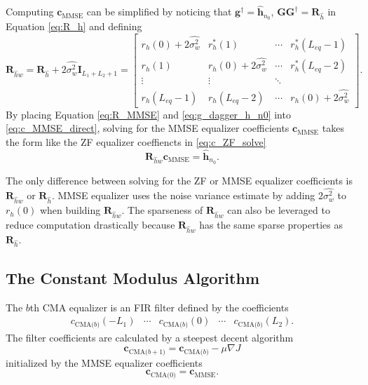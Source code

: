 Computing $\mathbf{c}_\text{MMSE}$ can be simplified by noticing that $\mathbf{g}^\dagger = \hat{\mathbf{h}}_{n_0}$, $\mathbf{G}\mathbf{G}^\dagger = \mathbf{R}_{\hat{h}}$ in Equation \eqref{eq:R_h} and defining
\begin{equation}
\mathbf{R}_{\hat{h}w} = 
\mathbf{R}_{\hat{h}} + 2\hat{\sigma^2_w} \mathbf{I}_{L_1+L_2+1} = 
		\begin{bmatrix}
		r_{h}(0) + 2\hat{\sigma^2_w}	& r^\ast_{h}(1)							& \cdots 	& r^\ast_{h}(L_{eq}-1)  	\\
		r_{h}(1) 						& r_{h}(0) + 2\hat{\sigma^2_w}& \cdots 	& r^\ast_{h}(L_{eq}-2)  				\\
		\vdots	 						& \vdots								& \ddots 	&  							\\
		r_{h}(L_{eq}-1)					& r_{h}(L_{eq}-2)						& \cdots	& r_{h}(0) + 2\hat{\sigma^2_w}  			
	\end{bmatrix}.
	\label{eq:R_MMSE}
\end{equation}
By placing Equation \eqref{eq:R_MMSE} and \eqref{eq:g_dagger_h_n0} into \eqref{eq:c_MMSE_direct}, solving for the MMSE equalizer coefficients $\mathbf{c}_\text{MMSE}$ takes the form like the ZF equalizer coeffiencts in \eqref{eq:c_ZF_solve}
\begin{equation}
\mathbf{R}_{\hat{h}w}\mathbf{c}_\text{MMSE} = \hat{\mathbf{h}}_{n_0}.
\label{eq:c_MMSE_solve}
\end{equation}


The only difference between solving for the ZF or MMSE equalizer coefficients is $\mathbf{R}_{\hat{h}w}$ or $\mathbf{R}_{\hat{h}}$. 
MMSE equalizer uses the noise variance estimate by adding $2\hat{\sigma^2_w}$ to $r_h(0)$ when building $\mathbf{R}_{\hat{h}w}$.
The sparseness of $\mathbf{R}_{\hat{h}w}$ can also be leveraged to reduce computation drastically because
$\mathbf{R}_{\hat{h}w}$ has the same sparse properties as $\mathbf{R}_{\hat{h}}$.

\subsection{The Constant Modulus Algorithm}
The $b$th CMA equalizer is an FIR filter defined by the coefficients
\begin{equation}
\begin{matrix}
c_\text{CMA($b$)}(-L_1) & \cdots & c_\text{CMA($b$)}(0) & \cdots & c_\text{CMA($b$)}(L_2).
\end{matrix}
\end{equation}
The filter coefficients are calculated by a steepest decent algorithm 
\begin{equation}
\mathbf{c}_\text{CMA($b+1$)} = \mathbf{c}_\text{CMA($b$)}-\mu \nabla J
\label{eq:steepest}
\end{equation}
initialized by the MMSE equalizer coefficients
\begin{equation}
\mathbf{c}_\text{CMA($0$)} = \mathbf{c}_\text{MMSE}.
\end{equation}

